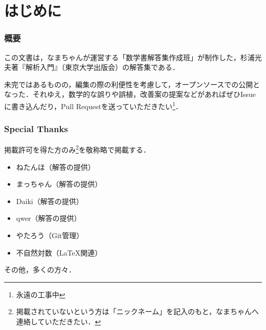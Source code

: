 \documentclass[a4paper,10pt,fleqn]{ltjsarticle}
\begin{document}


\thispagestyle{empty}

\newpage
{}
\pagecolor{white}

\begin{multicols}{3}
    \tableofcontents
\end{multicols}

\newpage

\part*{はじめに}


\section*{概要}

この文書は，なまちゃんが運営する「数学書解答集作成班」が制作した，杉浦光夫著『解析入門』（東京大学出版会）の解答集である．

未完ではあるものの，編集の際の利便性を考慮して，オープンソースでの公開となった．それゆえ，数学的な誤りや誤植，改善案の提案などがあればぜひIssueに書き込んだり，Pull Requestを送っていただきたい\footnote{永遠の工事中}．


\section*{Special Thanks}

掲載許可を得た方のみ\footnote{掲載されていないという方は「ニックネーム」を記入のもと，なまちゃんへ連絡していただきたい．}を敬称略で掲載する．
\begin{itemize}
    \item ねたんほ（解答の提供）
    \item まっちゃん（解答の提供）
    \item Daiki（解答の提供）
    \item qwer（解答の提供）
    \item やたろう（Git管理）
    \item 不自然対数（\LaTeX 関連）
\end{itemize}

その他，多くの方々．

\newpage
\end{document}
